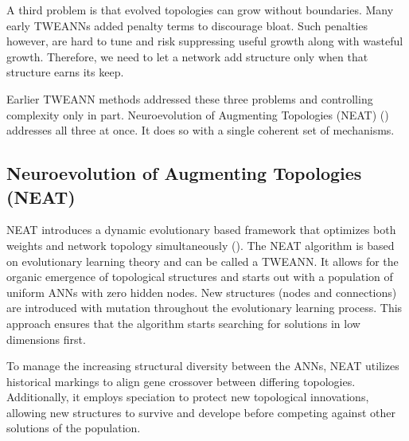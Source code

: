 \documentclass[12pt]{article}
\begin{document}
A third problem is that evolved topologies can grow without boundaries. Many early TWEANNs added penalty terms to discourage bloat. Such penalties however, are hard to tune and risk suppressing useful growth along with wasteful growth. Therefore, we need to let a network add structure only when that structure earns its keep.

Earlier TWEANN methods addressed these three problems and controlling complexity only in part. Neuroevolution of Augmenting Topologies (NEAT) (\cite{stanley_evolving_2002}) addresses all three at once. It does so with a single coherent set of mechanisms.




\subsection{Neuroevolution of Augmenting Topologies (NEAT)}



NEAT introduces a dynamic evolutionary based framework that optimizes both weights and network topology simultaneously (\cite{stanley_evolving_2002}). 
The NEAT algorithm is based on evolutionary learning theory and can be called a TWEANN. It allows for the organic emergence of topological structures and starts out with a population of uniform ANNs with zero hidden nodes. New structures (nodes and connections) are introduced with mutation throughout the evolutionary learning process. This approach ensures that the algorithm starts searching for solutions in low dimensions first.

To manage the increasing structural diversity between the ANNs, NEAT utilizes historical markings to align gene crossover between differing topologies. Additionally, it employs speciation to protect new topological innovations, allowing new structures to survive and develope before competing against other solutions of the population.
\end{document}

